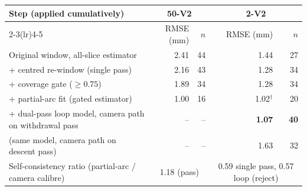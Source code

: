 \begin{tabular}{lrrrr}
\toprule
Step (applied cumulatively) & \multicolumn{2}{c}{50-V2} & \multicolumn{2}{c}{2-V2} \\
\cmidrule(lr){2-3}\cmidrule(lr){4-5}
 & RMSE (mm) & $n$ & RMSE (mm) & $n$ \\
\midrule
Original window, all-slice estimator & 2.41 & 44 & 1.44 & 27 \\
+ centred re-window (single pass) & 2.16 & 43 & 1.28 & 34 \\
+ coverage gate ($\geq0.75$) & 1.89 & 34 & 1.28 & 34 \\
+ partial-arc fit (gated estimator) & 1.00 & 16 & 1.02$^{\dagger}$ & 20 \\
+ dual-pass loop model, camera path on withdrawal pass & -- & -- & \textbf{1.07} & \textbf{40} \\
\quad (same model, camera path on descent pass) & -- & -- & 1.63 & 32 \\
Self-consistency ratio (partial-arc / camera calibre) & \multicolumn{2}{c}{1.18 (pass)} & \multicolumn{2}{c}{0.59 single pass, 0.57 loop (reject)} \\
\bottomrule
\end{tabular}
